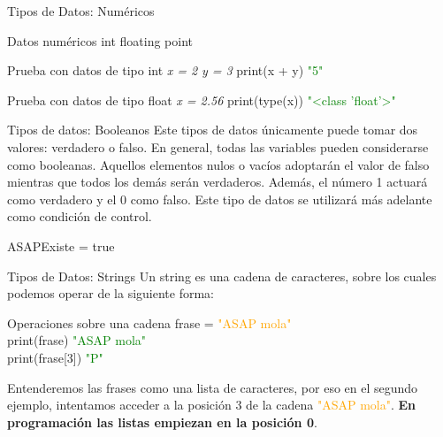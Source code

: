 \documentclass{beamer}
\begin{document}
\begin{frame} {Tipos de Datos: Numéricos}
\label{datos:numericos}
\begin{block}{Datos numéricos}
int
floating point
\end{block}
\begin{Programexample}{Prueba con datos de tipo int}
\centering
\textit{x = 2}
\textit{y = 3}
print(x + y)
\textcolor{green}{"5"}
\end{Programexample}
\begin{Programexample}{Prueba con datos de tipo float}
\centering\textit{x = 2.56}
print(type(x))
\textcolor{green}{"<class 'float'>"}
\end{Programexample}
\end{frame}

\begin{frame}{Tipos de datos: Booleanos}
\label{datos:booleanos}
Este tipos de datos únicamente puede tomar dos valores: verdadero o falso. En general, todas las variables pueden considerarse como booleanas. Aquellos elementos nulos o vacíos adoptarán el valor de falso mientras que todos los demás serán verdaderos. Además, el número 1 actuará como verdadero y el 0 como falso.
Este tipo de datos se utilizará más adelante como condición de control.
\begin{Programexample}
\centering ASAPExiste = true
\end{Programexample}
\end{frame}

\begin{frame} {Tipos de Datos: Strings}
\label{datos:strings}
Un string es una cadena de caracteres, sobre los cuales podemos operar de la siguiente forma:
\begin{Programexample} {Operaciones sobre una cadena}
frase = \textcolor{orange}{"ASAP mola"}\\
print(frase) \hspace{2.7cm} \textcolor{green}{"ASAP mola"}\\
print(frase[3])\hspace{2.4cm} \textcolor{green}{"P"}
\end{Programexample}
Entenderemos las frases como una lista de caracteres, por eso en el segundo ejemplo, intentamos acceder a la posición 3 de la cadena  \textcolor{orange}{"ASAP mola"}.
\textbf{En programación las listas empiezan en la posición 0}.
\end{frame}
\end{document}
